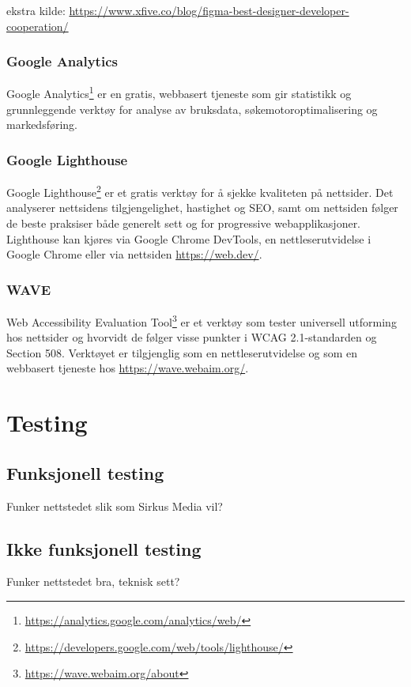 ekstra kilde: \url{https://www.xfive.co/blog/figma-best-designer-developer-cooperation/}

\subsubsection{Google Analytics}
\label{sec:google-analytics}
Google Analytics\footnote{\url{https://analytics.google.com/analytics/web/}} er en gratis, webbasert tjeneste som gir statistikk og grunnleggende verktøy for analyse av bruksdata, søkemotoroptimalisering og markedsføring.

\subsubsection{Google Lighthouse}
Google Lighthouse\footnote{\url{https://developers.google.com/web/tools/lighthouse/}} er et gratis verktøy for å sjekke kvaliteten på nettsider. Det analyserer nettsidens tilgjengelighet, hastighet og SEO, samt om nettsiden følger de beste praksiser både generelt sett og for progressive webapplikasjoner. Lighthouse kan kjøres via Google Chrome DevTools, en nettleserutvidelse i Google Chrome eller via nettsiden \url{https://web.dev/}.

\subsubsection{WAVE}
Web Accessibility Evaluation Tool\footnote{\url{https://wave.webaim.org/about}} er et verktøy som tester universell utforming hos nettsider og hvorvidt de følger visse punkter i WCAG 2.1-standarden og Section 508. Verktøyet er tilgjenglig som en nettleserutvidelse og som en webbasert tjeneste hos \url{https://wave.webaim.org/}.

\section{Testing}

\subsection{Funksjonell testing}
Funker nettstedet slik som Sirkus Media vil?

\subsection{Ikke funksjonell testing}
Funker nettstedet bra, teknisk sett?

